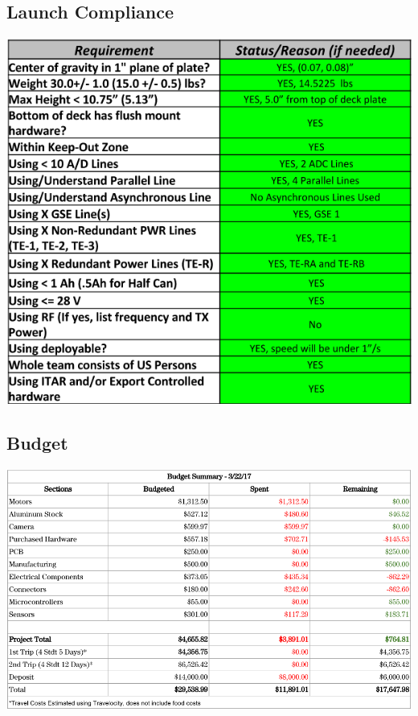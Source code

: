 \subsection{Launch Compliance}
\includegraphics[width=\textwidth]{./images/OtherDocs/userGuideCompliance}

\subsection{Budget}
\includegraphics[width=\textwidth]{./images/OtherDocs/budget}
